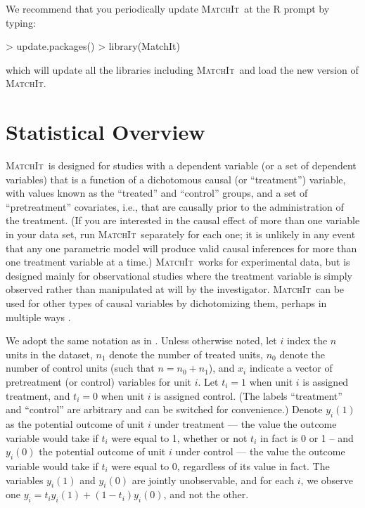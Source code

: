 \documentclass[oneside,letterpaper,titlepage]{article}
\newcommand{\MatchIt}{\textsc{MatchIt}}
\begin{document}
We recommend that you periodically update \MatchIt\ at the R prompt by typing:
\begin{Schunk}
\begin{Sinput}
> update.packages()
> library(MatchIt)
\end{Sinput}
\end{Schunk}
which will update all the libraries including \MatchIt\ and load the
new version of \MatchIt.


\section{Statistical Overview}

\MatchIt\ is designed for studies with a dependent variable (or a set
of dependent variables) that is a function of a dichotomous causal (or
``treatment'') variable, with values known as the ``treated'' and
``control'' groups, and a set of ``pretreatment'' covariates, i.e.,
that are causally prior to the administration of the treatment.  (If
you are interested in the causal effect of more than one variable in
your data set, run \MatchIt\ separately for each one; it is unlikely
in any event that any one parametric model will produce valid causal
inferences for more than one treatment variable at a time.)  \MatchIt\
works for experimental data, but is designed mainly for observational
studies where the treatment variable is simply observed rather than
manipulated at will by the investigator.  \MatchIt\ can be used for
other types of causal variables by dichotomizing them, perhaps in
multiple ways \citep[see also][]{ImaDyk04}.

We adopt the same notation as in \citet*{HoImaKin05}. Unless otherwise
noted, let $i$ index the $n$ units in the dataset, $n_1$ denote the
number of treated units, $n_0$ denote the number of control units
(such that $n=n_0+n_1$), and $x_i$ indicate a vector of pretreatment
(or control) variables for unit $i$.  Let $t_i=1$ when unit $i$ is
assigned treatment, and $t_i=0$ when unit $i$ is assigned control.
(The labels ``treatment'' and ``control'' are arbitrary and can be
switched for convenience.)  Denote $y_i(1)$ as the potential outcome
of unit $i$ under treatment --- the value the outcome variable would
take if $t_i$ were equal to 1, whether or not $t_i$ in fact is 0 or 1
-- and $y_i(0)$ the potential outcome of unit $i$ under control ---
the value the outcome variable would take if $t_i$ were equal to 0,
regardless of its value in fact.  The variables $y_i(1)$ and $y_i(0)$
are jointly unobservable, and for each $i$, we observe one
$y_i=t_iy_i(1)+(1-t_i)y_i(0)$, and not the other.
\end{document}
